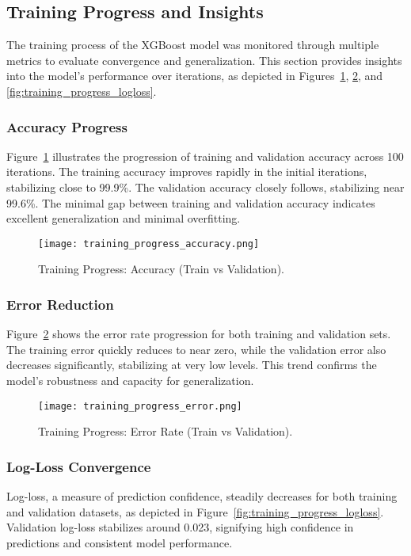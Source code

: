 \documentclass[
    13pt, %
    a4paper, %
    DIV14, %
    listof=totoc, %
    bibliography=totoc, %
    index=totoc, %
    headsepline
]{scrreprt}
\begin{document}
\newpage
\subsection{Training Progress and Insights}
\label{subsec:training_progress}

The training process of the XGBoost model was monitored through multiple metrics to evaluate convergence and generalization. This section provides insights into the model's performance over iterations, as depicted in Figures~\ref{fig:training_progress_accuracy}, \ref{fig:training_progress_error}, and \ref{fig:training_progress_logloss}.

\subsubsection{Accuracy Progress}
\noindent
Figure~\ref{fig:training_progress_accuracy} illustrates the progression of training and validation accuracy across 100 iterations. The training accuracy improves rapidly in the initial iterations, stabilizing close to 99.9\%. The validation accuracy closely follows, stabilizing near 99.6\%. The minimal gap between training and validation accuracy indicates excellent generalization and minimal overfitting.

\begin{figure}[H]
    \centering
    \texttt{[image: training\_progress\_accuracy.png]}
    \caption{Training Progress: Accuracy (Train vs Validation).}
    \label{fig:training_progress_accuracy}
\end{figure}


\subsubsection{Error Reduction}
\noindent
Figure~\ref{fig:training_progress_error} shows the error rate progression for both training and validation sets. The training error quickly reduces to near zero, while the validation error also decreases significantly, stabilizing at very low levels. This trend confirms the model's robustness and capacity for generalization.

\begin{figure}[H]
    \centering
    \texttt{[image: training\_progress\_error.png]}
    \caption{Training Progress: Error Rate (Train vs Validation).}
    \label{fig:training_progress_error}
\end{figure}

\subsubsection{Log-Loss Convergence}
\noindent
Log-loss, a measure of prediction confidence, steadily decreases for both training and validation datasets, as depicted in Figure~\ref{fig:training_progress_logloss}. Validation log-loss stabilizes around 0.023, signifying high confidence in predictions and consistent model performance.
\end{document}
